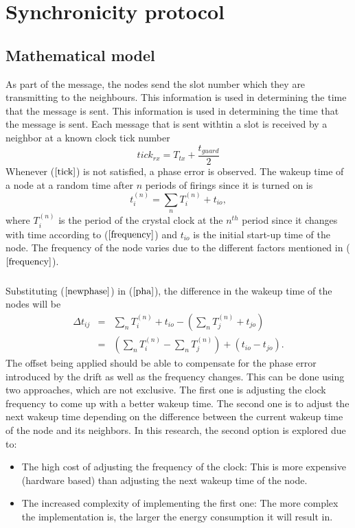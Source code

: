 \documentclass[a4paper,10pt]{report}
\begin{document}
\chapter{\textbf{Synchronicity protocol}}
\section{\textbf{Mathematical model}}
As part of the message, the nodes send the slot number which they are transmitting to the neighbours. This information is used in determining the time that the message is sent. This information is used in determining the time that the message is sent. Each message that is sent withtin a slot is received by a neighbor at a known clock tick number 
\begin{equation}
tick_{rx} = T_{tx}+ \frac{t_{guard}}{2} \label{tick}
\end{equation}
Whenever ($\ref{tick}$) is not satisfied, a phase error is observed. The wakeup time of a node at a random time after $n$ periods of firings since it is turned on is
\begin{equation}
t_i^{(n)} = \sum_{n} T_i^{(n)} + t_{io},\label{newphase}
\end{equation}
where  $T_i^{(n)}$ is the period of the crystal clock at the $n^{th}$ period since it changes with time according to
($\ref{frequency}$) and $t_{io}$ is the initial start-up time of the node. The frequency of the node varies due to the different factors mentioned in ($\ref{frequency}$). \paragraph*{}
Substituting ($\ref{newphase}$) in ($\ref{pha}$), the difference in the wakeup time of the nodes will be 
\begin{eqnarray}
\Delta t_{ij} & = & \sum_{n}T_i^{(n)} + t_{io}- (\sum_{n}T_j^{(n)} +
t_{jo}) \\ &=& (\sum_{n}T_i^{(n)} - \sum_{n}T_j^{(n)}) +
(t_{io}-t_{jo}).
\end{eqnarray}
The offset being applied should be able to compensate for the phase error introduced by the drift as well as the frequency changes. This can be done using two approaches, which are not exclusive. The first one is adjusting the clock frequency to come up with a better wakeup time. The second one is to adjust the next wakeup time depending on the difference between the current wakeup time of the node and its neighbors. In this research, the second option is explored due to:
\begin{itemize}
\item The high cost of adjusting the frequency of the clock: This is more expensive (hardware based) than adjusting the next wakeup time of the node.
\item The increased complexity of implementing the first one: The more complex the implementation is, the larger the energy consumption it will result in.
\end{itemize}
\end{document}

